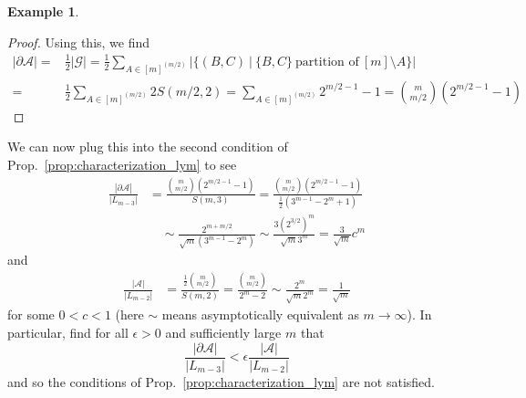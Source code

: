 \documentclass{scrartcl}
\theoremstyle{definition}
\newtheorem{example}[definition]{Example}
\begin{document}
\begin{example}
\begin{proof}
        Using this, we find
        \begin{align*}
            |\partial \mathcal{A}| =& \frac 1 2 |\mathcal{G}| = \frac 1 2 \sum_{A \in [m]^{(m/2)}} |\{ (B, C) \ | \ \{ B, C \} \ \text{partition of} \ [m] \setminus A \}| \\
            =& \frac 1 2 \sum_{A \in [m]^{(m/2)}} 2 S(m/2, 2) = \sum_{A \in [m]^{(m/2)}} 2^{m/2 - 1} - 1 = {m \choose m/2} \left( 2^{m/2 - 1} - 1 \right)
        \end{align*}
    \end{proof}
    We can now plug this into the second condition of Prop.~\ref{prop:characterization_lym} to see
    \begin{align*}
        \frac {|\partial \mathcal{A}|} {|L_{m - 3}|} &= \frac {{m \choose m/2}\left( 2^{m/2 - 1} - 1\right)} {S(m, 3)} = \frac {{m \choose m/2}\left( 2^{m/2 - 1} - 1\right)} {\frac 1 2 \left( 3^{m - 1} - 2^m + 1 \right)} \\
        &\quad \sim \frac {2^{m + m/2}} {\sqrt{m}(3^{m - 1} - 2^m)} \sim \frac {3 \left( 2^{3/2} \right)^m} {\sqrt{m} 3^m} = \frac 3 {\sqrt{m}} c^m
    \end{align*}
    and
    \begin{align*}
        \frac {|\mathcal{A}|} {|L_{m - 2}|} &= \frac {\frac 1 2 {m \choose m/2}} {S(m, 2)} = \frac {{m \choose m/2}} {2^m - 2} \sim \frac {2^m} {\sqrt{m}2^m} = \frac 1 {\sqrt{m}}
    \end{align*}
    for some $0 < c < 1$ (here $\sim$ means asymptotically equivalent as $m \to \infty$).
    In particular, find for all $\epsilon > 0$ and sufficiently large $m$ that
    \begin{equation*}
        \frac {|\partial \mathcal{A}|} {|L_{m - 3}|} < \epsilon \frac {|\mathcal{A}|} {|L_{m - 2}|}
    \end{equation*}
    and so the conditions of Prop.~\ref{prop:characterization_lym} are not satisfied.
\end{example}
\end{document}
